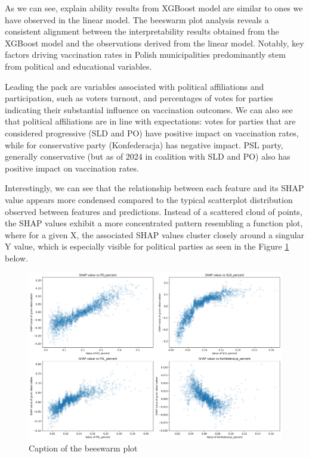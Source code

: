 \documentclass[a4paper,12pt]{article} %
\begin{document}
  As we can see, explain ability results from XGBoost model are similar to ones we have observed in the linear model. The beeswarm plot analysis reveals a consistent alignment between the interpretability results obtained from the XGBoost model and the observations derived from the linear model. Notably, key factors driving vaccination rates in Polish municipalities predominantly stem from political and educational variables.

  Leading the pack are variables associated with political affiliations and participation, such as voters turnout, and percentages of votes for parties indicating their substantial influence on vaccination outcomes. We can also see that political affiliations are in line with expectations: votes for parties that are considered progressive (SLD and PO) have positive impact on vaccination rates, while for conservative party (Konfederacja) has negative impact. PSL party, generally conservative (but as of 2024 in coalition with SLD and PO) also has positive impact on vaccination rates. 
  
  Interestingly, we can see that the relationship between each feature and its SHAP value appears more condensed compared to the typical scatterplot distribution observed between features and predictions. Instead of a scattered cloud of points, the SHAP values exhibit a more concentrated pattern resembling a function plot, where for a given X, the associated SHAP values cluster closely around a singular Y value, which is especially visible for political parties as seen in the Figure \ref{fig:parties_partial} below. 
  

  \begin{figure}[htbp]
    \centering
    \includegraphics[width=1\textwidth]{assets/parties_partial.png}
    \caption{Caption of the beeswarm plot}
    \label{fig:parties_partial}
  \end{figure}
\end{document}
